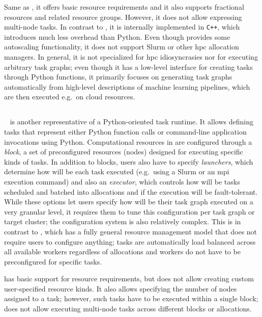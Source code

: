 \begin{spacing}{1}
Same as \dask{}, it offers basic resource requirements and it also supports fractional resources
and related resource groups. However, it does not allow expressing multi-node tasks. In contrast to \dask{}, it is internally implemented in \texttt{C++}, which introduces much less overhead than Python.
Even though \ray{} provides some autoscaling functionality, it does not support Slurm or other
\gls{hpc} allocation managers. In general, it is not specialized for
\gls{hpc} idiosyncrasies nor for executing arbitrary task graphs; even though it has
a low-level interface for creating tasks through Python functions, it primarily focuses on
generating task graphs automatically from high-level descriptions of machine learning pipelines,
which are then executed e.g.\ on cloud resources.

\subsection*{\parsl}
\parsl~\cite{parsl} is another representative of a Python-oriented task runtime. It
allows
defining tasks that represent either Python function calls or command-line application
invocations using Python. Computational resources in \parsl{} are configured through a
\emph{block}, a set of preconfigured resources (nodes) designed for executing specific
kinds of tasks. In addition to blocks, users also have to specify \emph{launchers}, which
determine how will be each task executed (e.g.\ using a Slurm or an \gls{mpi}
execution command) and also an \emph{executor}, which controls how will be tasks
scheduled and batched into allocations and if the execution will be fault-tolerant. While
these options let users specify how will be their task graph executed on a very granular level, it
requires them to tune this configuration per task graph or target cluster; the
configuration system is also relatively complex. This is in contrast to \hyperqueue{}, which has a fully general resource
management model that does not require users to configure anything; tasks are automatically
load balanced across all available workers regardless of allocations and workers do not have to be
preconfigured for specific tasks.

\parsl{} has basic support for resource requirements, but does not allow
creating custom user-specified resource kinds. It also allows specifying the number of nodes
assigned to a task; however, such tasks have to be executed within a single block; \parsl{}
does not allow executing multi-node tasks across different blocks or allocations.


\end{spacing}
